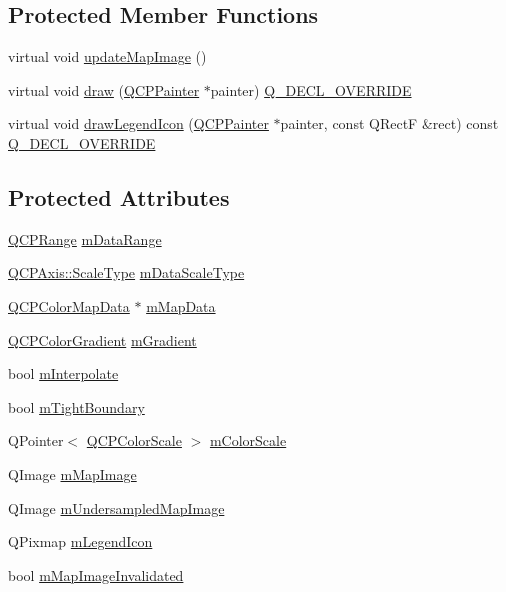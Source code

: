 \subsection*{Protected Member Functions}
\begin{DoxyCompactItemize}
\item 
virtual void \hyperlink{class_q_c_p_color_map_a5efcea591bb5486d968af520a4d43c3a}{update\+Map\+Image} ()
\item 
virtual void \hyperlink{class_q_c_p_color_map_a6b628014d2939368935efd0a788648c8}{draw} (\hyperlink{class_q_c_p_painter}{Q\+C\+P\+Painter} $\ast$painter) \hyperlink{qcustomplot_8h_a42cc5eaeb25b85f8b52d2a4b94c56f55}{Q\+\_\+\+D\+E\+C\+L\+\_\+\+O\+V\+E\+R\+R\+I\+DE}
\item 
virtual void \hyperlink{class_q_c_p_color_map_adeaa5e262a03b7f021bd1aa6f1e60ce9}{draw\+Legend\+Icon} (\hyperlink{class_q_c_p_painter}{Q\+C\+P\+Painter} $\ast$painter, const Q\+RectF \&rect) const \hyperlink{qcustomplot_8h_a42cc5eaeb25b85f8b52d2a4b94c56f55}{Q\+\_\+\+D\+E\+C\+L\+\_\+\+O\+V\+E\+R\+R\+I\+DE}
\end{DoxyCompactItemize}
\subsection*{Protected Attributes}
\begin{DoxyCompactItemize}
\item 
\hyperlink{class_q_c_p_range}{Q\+C\+P\+Range} \hyperlink{class_q_c_p_color_map_ab87609621d16cd3e9d52ad070b327b08}{m\+Data\+Range}
\item 
\hyperlink{class_q_c_p_axis_a36d8e8658dbaa179bf2aeb973db2d6f0}{Q\+C\+P\+Axis\+::\+Scale\+Type} \hyperlink{class_q_c_p_color_map_ab28a4b2def408f83b9818799d5f18446}{m\+Data\+Scale\+Type}
\item 
\hyperlink{class_q_c_p_color_map_data}{Q\+C\+P\+Color\+Map\+Data} $\ast$ \hyperlink{class_q_c_p_color_map_a8709272aa8f0be3ca111bf3866806f8b}{m\+Map\+Data}
\item 
\hyperlink{class_q_c_p_color_gradient}{Q\+C\+P\+Color\+Gradient} \hyperlink{class_q_c_p_color_map_aab77fe9a8df6f0486ab3507cc5f278fa}{m\+Gradient}
\item 
bool \hyperlink{class_q_c_p_color_map_af77e5eba9a844592648edeb6fbe834f1}{m\+Interpolate}
\item 
bool \hyperlink{class_q_c_p_color_map_ac2e9425fe4381b496726e1c09f978302}{m\+Tight\+Boundary}
\item 
Q\+Pointer$<$ \hyperlink{class_q_c_p_color_scale}{Q\+C\+P\+Color\+Scale} $>$ \hyperlink{class_q_c_p_color_map_a95b4100bacc3387652c988b071ec9db7}{m\+Color\+Scale}
\item 
Q\+Image \hyperlink{class_q_c_p_color_map_a66110813b42eca78b64095b2a1f285a0}{m\+Map\+Image}
\item 
Q\+Image \hyperlink{class_q_c_p_color_map_acad3d52f3572436d5f2e4057911ea8d3}{m\+Undersampled\+Map\+Image}
\item 
Q\+Pixmap \hyperlink{class_q_c_p_color_map_ada522988db02cb531767d38c5029ef60}{m\+Legend\+Icon}
\item 
bool \hyperlink{class_q_c_p_color_map_ac9aea6a5c193d7fa866bc7b26e79ef2c}{m\+Map\+Image\+Invalidated}
\end{DoxyCompactItemize}
